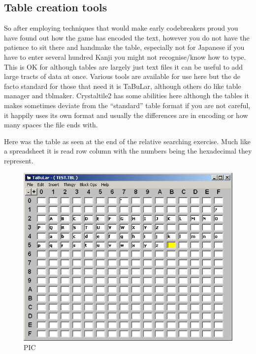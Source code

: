\documentclass[
]{book}
\begin{document}
\hypertarget{table-creation-tools}{%
\subsection{Table creation tools}\label{table-creation-tools}}

So after employing techniques that would make early codebreakers proud you have found out how the game has encoded the text, however you do not have the patience to sit there and handmake the table, especially not for Japanese if you have to enter several hundred Kanji you might not recognise/know how to type. This is OK for although tables are largely just text files it can be useful to add large tracts of data at once. Various tools are available for use here but the de facto standard for those that need it is TaBuLar, although others do like table manager and tblmaker. Crystaltile2 has some abilities here although the tables it makes sometimes deviate from the ``standard'' table format if you are not careful, it happily uses its own format and usually the differences are in encoding or how many spaces the file ends with.

Here was the table as seen at the end of the relative searching exercise. Much like a spreadsheet it is read row column with the numbers being the hexadecimal they represent.

\begin{figure}
\centering
\includegraphics{images/97_home_fast6191_romhackingguide_unrenamed_file___al_borders_romhackingguidertexttablemaking1.png}
\caption{PIC}
\end{figure}
\end{document}
